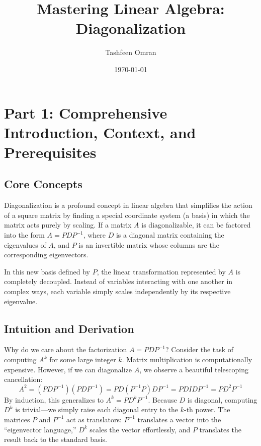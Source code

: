 \documentclass[11pt, a4paper]{article}
\title{\textbf{Mastering Linear Algebra: Diagonalization}}
\author{Tashfeen Omran}
\date{\today}
\theoremstyle{definition}
\theoremstyle{remark}
\begin{document}
\maketitle
\tableofcontents
\newpage

\section{Part 1: Comprehensive Introduction, Context, and Prerequisites}

\subsection{Core Concepts}
Diagonalization is a profound concept in linear algebra that simplifies the action of a square matrix by finding a special coordinate system (a basis) in which the matrix acts purely by scaling. If a matrix $A$ is diagonalizable, it can be factored into the form $A = PDP^{-1}$, where $D$ is a diagonal matrix containing the eigenvalues of $A$, and $P$ is an invertible matrix whose columns are the corresponding eigenvectors. 

In this new basis defined by $P$, the linear transformation represented by $A$ is completely decoupled. Instead of variables interacting with one another in complex ways, each variable simply scales independently by its respective eigenvalue.

\subsection{Intuition and Derivation}
Why do we care about the factorization $A = PDP^{-1}$? Consider the task of computing $A^k$ for some large integer $k$. Matrix multiplication is computationally expensive. However, if we can diagonalize $A$, we observe a beautiful telescoping cancellation:
\[
A^2 = (PDP^{-1})(PDP^{-1}) = PD(P^{-1}P)DP^{-1} = PDI DP^{-1} = PD^2P^{-1}
\]
By induction, this generalizes to $A^k = PD^kP^{-1}$. Because $D$ is diagonal, computing $D^k$ is trivial—we simply raise each diagonal entry to the $k$-th power. The matrices $P$ and $P^{-1}$ act as translators: $P^{-1}$ translates a vector into the ``eigenvector language,'' $D^k$ scales the vector effortlessly, and $P$ translates the result back to the standard basis.
\end{document}
